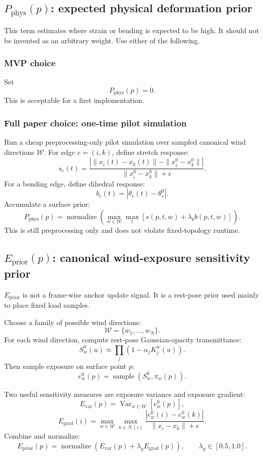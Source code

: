 \documentclass[11pt,a4paper]{article}
\newcommand{\normalize}{\operatorname{normalize}}
\newcommand{\Var}{\operatorname{Var}}
\begin{document}
\subsection{$P_{\mathrm{phys}}(p)$: expected physical deformation prior}

This term estimates where strain or bending is expected to be high. It should not be invented as an arbitrary weight. Use either of the following.

\subsubsection{MVP choice}

Set
\[
P_{\mathrm{phys}}(p)=0.
\]
This is acceptable for a first implementation.

\subsubsection{Full paper choice: one-time pilot simulation}

Run a cheap preprocessing-only pilot simulation over sampled canonical wind directions $\mathcal{W}$. For edge $e=(i,k)$, define stretch response:
\[
s_e(t)=\frac{\left|\|x_i(t)-x_k(t)\|-\|x_i^0-x_k^0\|\right|}{\|x_i^0-x_k^0\|+\epsilon}.
\]
For a bending edge, define dihedral response:
\[
b_e(t)=|\theta_e(t)-\theta_e^0|.
\]
Accumulate a surface prior:
\[
P_{\mathrm{phys}}(p)=
\normalize\left(
\max_{w\in\mathcal{W}}\max_t
\left[s(p,t,w)+\lambda_b b(p,t,w)\right]
\right).
\]
This is still preprocessing only and does not violate fixed-topology runtime.

\subsection{$E_{\mathrm{prior}}(p)$: canonical wind-exposure sensitivity prior}

$E_{\mathrm{prior}}$ is not a frame-wise anchor update signal. It is a rest-pose prior used mainly to place fixed load samples.

Choose a family of possible wind directions:
\[
\mathcal{W}=\{w_1,\dots,w_N\}.
\]
For each wind direction, compute rest-pose Gaussian-opacity transmittance:
\[
S_w^0(u)\approx\prod_j\left(1-\alpha_jK_j^w(u)\right).
\]
Then sample exposure on surface point $p$:
\[
e_w^0(p)=\operatorname{sample}(S_w^0,\pi_w(p)).
\]

Two useful sensitivity measures are exposure variance and exposure gradient:
\[
E_{\mathrm{var}}(p)=\Var_{w\in\mathcal{W}}[e_w^0(p)],
\]
\[
E_{\mathrm{grad}}(i)=
\max_{w\in\mathcal{W}}\max_{k\in\mathcal{N}(i)}
\frac{|e_w^0(i)-e_w^0(k)|}{\|x_i-x_k\|+\epsilon}.
\]
Combine and normalize:
\[
E_{\mathrm{prior}}(p)=
\normalize\left(E_{\mathrm{var}}(p)+\lambda_gE_{\mathrm{grad}}(p)\right),
\qquad \lambda_g\in[0.5,1.0].
\]
\end{document}
